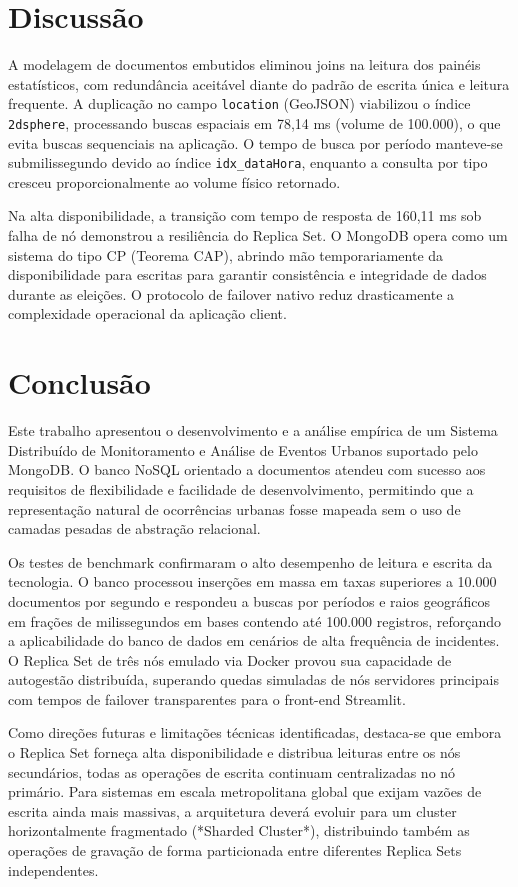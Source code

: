 \documentclass[12pt]{article}
\begin{document}
\section{Discussão}
\label{sec:discussao}

A modelagem de documentos embutidos eliminou joins na leitura dos painéis estatísticos, com redundância aceitável diante do padrão de escrita única e leitura frequente. A duplicação no campo \texttt{location} (GeoJSON) viabilizou o índice \texttt{2dsphere}, processando buscas espaciais em 78,14 ms (volume de 100.000), o que evita buscas sequenciais na aplicação. O tempo de busca por período manteve-se submilissegundo devido ao índice \texttt{idx\_dataHora}, enquanto a consulta por tipo cresceu proporcionalmente ao volume físico retornado.

Na alta disponibilidade, a transição com tempo de resposta de 160,11 ms sob falha de nó demonstrou a resiliência do Replica Set. O MongoDB opera como um sistema do tipo CP (Teorema CAP), abrindo mão temporariamente da disponibilidade para escritas para garantir consistência e integridade de dados durante as eleições. O protocolo de failover nativo reduz drasticamente a complexidade operacional da aplicação client.

\section{Conclusão}
\label{sec:conclusao}

Este trabalho apresentou o desenvolvimento e a análise empírica de um Sistema Distribuído de Monitoramento e Análise de Eventos Urbanos suportado pelo MongoDB. O banco NoSQL orientado a documentos atendeu com sucesso aos requisitos de flexibilidade e facilidade de desenvolvimento, permitindo que a representação natural de ocorrências urbanas fosse mapeada sem o uso de camadas pesadas de abstração relacional.

Os testes de benchmark confirmaram o alto desempenho de leitura e escrita da tecnologia. O banco processou inserções em massa em taxas superiores a 10.000 documentos por segundo e respondeu a buscas por períodos e raios geográficos em frações de milissegundos em bases contendo até 100.000 registros, reforçando a aplicabilidade do banco de dados em cenários de alta frequência de incidentes. O Replica Set de três nós emulado via Docker provou sua capacidade de autogestão distribuída, superando quedas simuladas de nós servidores principais com tempos de failover transparentes para o front-end Streamlit.

Como direções futuras e limitações técnicas identificadas, destaca-se que embora o Replica Set forneça alta disponibilidade e distribua leituras entre os nós secundários, todas as operações de escrita continuam centralizadas no nó primário. Para sistemas em escala metropolitana global que exijam vazões de escrita ainda mais massivas, a arquitetura deverá evoluir para um cluster horizontalmente fragmentado (*Sharded Cluster*), distribuindo também as operações de gravação de forma particionada entre diferentes Replica Sets independentes.
\end{document}
